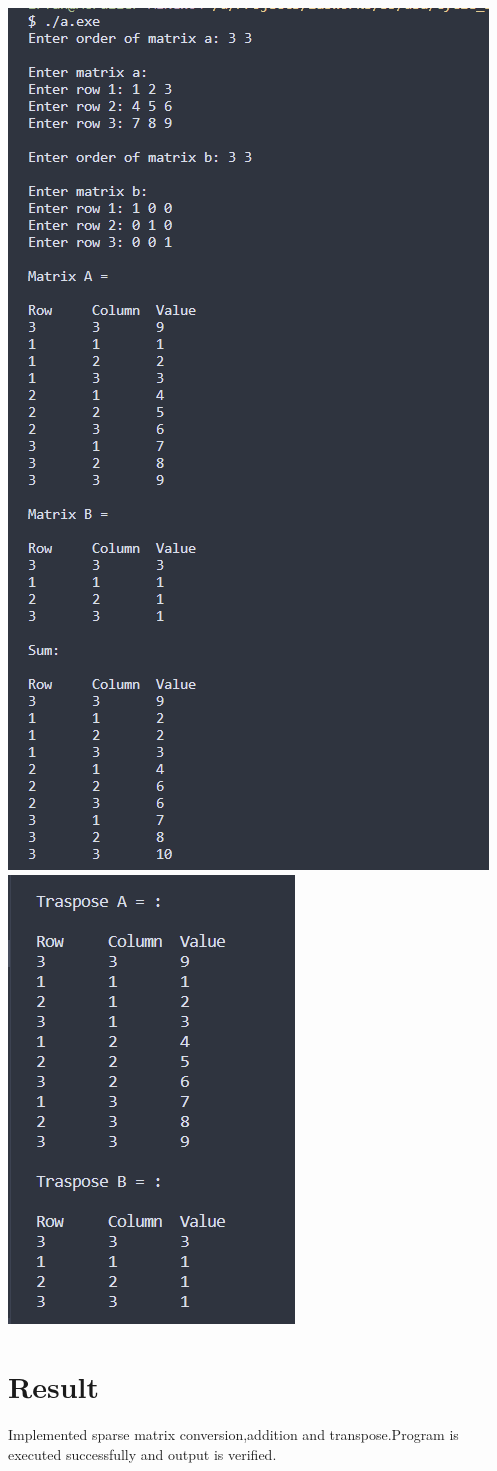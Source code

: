 \includegraphics[]{Cycle_1/Outputs/SparseMatrix.png}
\includegraphics[]{Cycle_1/Outputs/SparseTranspose.png}

\section{Result}
Implemented sparse matrix conversion,addition and transpose.Program is executed successfully and output is verified.